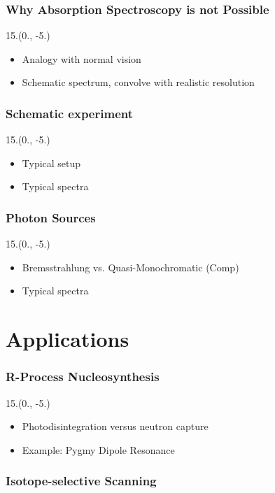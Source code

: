 \documentclass{beamer}
\begin{document}
\begin{frame}
    \frametitle{Why Absorption Spectroscopy is not Possible}
    \begin{textblock}{15.}(0., -5.)
        \begin{itemize}
            \item Analogy with normal vision
            \item Schematic spectrum, convolve with realistic resolution
        \end{itemize}
    \end{textblock}
\end{frame}

\begin{frame}
    \frametitle{Schematic experiment}
    \begin{textblock}{15.}(0., -5.)
        \begin{itemize}
            \item Typical setup
            \item Typical spectra
        \end{itemize}
    \end{textblock}
\end{frame}

\begin{frame}
    \frametitle{Photon Sources}
    \begin{textblock}{15.}(0., -5.)
        \begin{itemize}
            \item Bremsstrahlung vs. Quasi-Monochromatic (Comp)
            \item Typical spectra
        \end{itemize}
    \end{textblock}
\end{frame}

\section{Applications}
\begin{frame}
    \frametitle{R-Process Nucleosynthesis}
    \begin{textblock}{15.}(0., -5.)
        \begin{itemize}
            \item Photodisintegration versus neutron capture
            \item Example: Pygmy Dipole Resonance
        \end{itemize}
    \end{textblock}    
\end{frame}
\begin{frame}
    \frametitle{Isotope-selective Scanning}
\end{frame}
\end{document}

